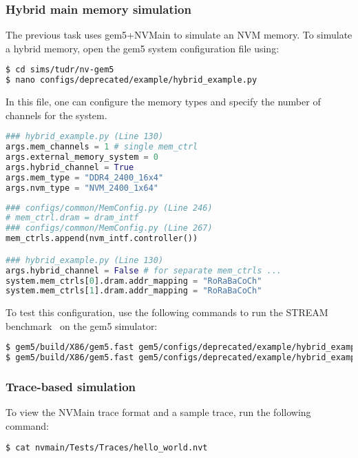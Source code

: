 \subsubsection*{Hybrid main memory simulation}
\label{app:tudr:hybrid}
The previous task uses gem5+NVMain to simulate an NVM memory. To simulate a hybrid memory, open the gem5 system configuration file using:
\begin{lstlisting}[language=bash]
$ cd sims/tudr/nv-gem5
$ nano configs/deprecated/example/hybrid_example.py
\end{lstlisting}
In this file, one can configure the memory types and specify the number of channels for the system.
\begin{lstlisting}[language=Python]
### hybrid_example.py (Line 130)
args.mem_channels = 1 # single mem_ctrl
args.external_memory_system = 0
args.hybrid_channel = True
args.mem_type = "DDR4_2400_16x4"
args.nvm_type = "NVM_2400_1x64"
\end{lstlisting}

\begin{lstlisting}[language=Python]
### configs/common/MemConfig.py (Line 246)
# mem_ctrl.dram = dram_intf
### configs/common/MemConfig.py (Line 267)
mem_ctrls.append(nvm_intf.controller())

### hybrid_example.py (Line 130)
args.hybrid_channel = False # for separate mem_ctrls ...
system.mem_ctrls[0].dram.addr_mapping = "RoRaBaCoCh"
system.mem_ctrls[1].dram.addr_mapping = "RoRaBaCoCh"
\end{lstlisting}

To test this configuration, use the following commands to run the STREAM benchmark~\cite{stream_bench} on the gem5 simulator:

\begin{lstlisting}[language=bash]
$ gem5/build/X86/gem5.fast gem5/configs/deprecated/example/hybrid_example.py NVM_tutorial/stream_8k.bin
$ gem5/build/X86/gem5.fast gem5/configs/deprecated/example/hybrid_example.py NVM_tutorial/stream_8k_P.bin
\end{lstlisting}


\subsubsection*{Trace-based simulation}
\label{app:tudr:traceSim}
To view the NVMain trace format and a sample trace, run the following command:
\begin{lstlisting}[language=bash]
$ cat nvmain/Tests/Traces/hello_world.nvt
\end{lstlisting}


